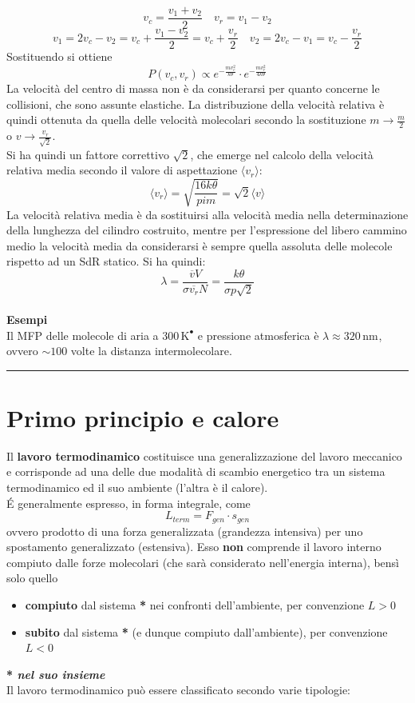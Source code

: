 \documentclass[10pt, oneside]{book}
\newcommand{\kelvin}[1]{\, \mathrm{K^{#1}}}
\newcommand{\meters}[2]{\, \mathrm{#1 m^{#2}}}
\newcommand{\mean}[1]{\langle #1 \rangle}
\newcommand{\infobox}[2]{\vspace{0.5cm}~\\ \textbf{#1} \hrulefill \vspace{0.2cm}\\#2 {}\,\\\hrule \vspace{0.5cm}}
\newcommand{\ds}{\displaystyle}
\begin{document}
\[v_c = \frac{v_1 + v_2}{2} \quad v_r = v_1 - v_2\]
\[v_1 = 2 v_c - v_2 = v_c + \frac{v_1 - v_2}{2}= v_c + \frac{v_r}{2} \quad v_2 = 2 v_c - v_1 = v_c - \frac{v_r}{2}\]
Sostituendo si ottiene
\[P(v_c, v_r) \propto e^{\displaystyle - \frac{m v_c^2}{k \theta}} \cdot e^{\displaystyle - \frac{m v_r^2}{4k \theta}}\]
La velocità del centro di massa non è da considerarsi per quanto concerne le collisioni, che sono assunte elastiche. La distribuzione della velocità relativa è quindi ottenuta da quella delle velocità molecolari secondo la sostituzione $\ds m \rightarrow \frac{m}{2}$ o $\ds v \rightarrow \frac{v_r}{\sqrt{2}}$.\\
Si ha quindi un fattore correttivo $\ds \sqrt{2}$, che emerge nel calcolo della velocità relativa media secondo il valore di aspettazione $\mean{v_r}$:
\[\mean{v_r} = \sqrt{\frac{16 k \theta}{pi m}}= \sqrt{2} \mean{v}\]
La velocità relativa media è da sostituirsi alla velocità media nella determinazione della lunghezza del cilindro costruito, mentre per l'espressione del libero cammino medio la velocità media da considerarsi è sempre quella assoluta delle molecole rispetto ad un SdR statico. Si ha quindi:
\[\lambda = \frac{\overline{v} V}{\sigma \overline{v_r} N} = \frac{k \theta}{\sigma p \sqrt{2}}\]
\infobox{Esempi}{Il MFP delle molecole di aria a $300 \kelvin{•}$ e pressione atmosferica è $\lambda \approx 320 \meters{n}{}$, ovvero $\sim 100$ volte la distanza intermolecolare.}

\chapter{Primo principio e calore}
Il \textbf{lavoro termodinamico} costituisce una generalizzazione del lavoro meccanico e corrisponde ad una delle due modalità di scambio energetico tra un sistema termodinamico ed il suo ambiente (l'altra è il calore).\\
\'E generalmente espresso, in forma integrale, come
\[L_{term} = F_{gen} \cdot s_{gen}\]
ovvero prodotto di una forza generalizzata (grandezza intensiva) per uno spostamento generalizzato (estensiva). Esso \textbf{non} comprende il lavoro interno compiuto dalle forze molecolari (che sarà considerato nell'energia interna), bensì solo quello
\begin{itemize}
\item \textbf{compiuto} dal sistema \textbf{*} nei confronti dell'ambiente, per convenzione $L > 0$
\item \textbf{subito} dal sistema \textbf{*} (e dunque compiuto dall'ambiente), per convenzione $L < 0$ 
\end{itemize}
\textbf{* \textit{nel suo insieme}}\\
Il lavoro termodinamico può essere classificato secondo varie tipologie:
\end{document}
